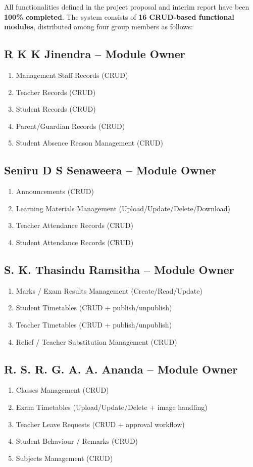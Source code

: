 \documentclass[12pt, a4paper]{report}
\begin{document}
All functionalities defined in the project proposal and interim report have been \textbf{100\% completed}. The system consists of \textbf{16 CRUD-based functional modules}, distributed among four group members as follows:

\subsection{R K K Jinendra -- Module Owner}
\begin{enumerate}
    \item Management Staff Records (CRUD)
    \item Teacher Records (CRUD)
    \item Student Records (CRUD)
    \item Parent/Guardian Records (CRUD)
    \item Student Absence Reason Management (CRUD)
\end{enumerate}

\subsection{Seniru D S Senaweera -- Module Owner}
\begin{enumerate}
    \item Announcements (CRUD)
    \item Learning Materials Management (Upload/Update/Delete/Download)
    \item Teacher Attendance Records (CRUD)
    \item Student Attendance Records (CRUD)
\end{enumerate}

\subsection{S. K. Thasindu Ramsitha -- Module Owner}
\begin{enumerate}
    \item Marks / Exam Results Management (Create/Read/Update)
    \item Student Timetables (CRUD + publish/unpublish)
    \item Teacher Timetables (CRUD + publish/unpublish)
    \item Relief / Teacher Substitution Management (CRUD)
\end{enumerate}

\subsection{R. S. R. G. A. A. Ananda -- Module Owner}
\begin{enumerate}
    \item Classes Management (CRUD)
    \item Exam Timetables (Upload/Update/Delete + image handling)
    \item Teacher Leave Requests (CRUD + approval workflow)
    \item Student Behaviour / Remarks (CRUD)
    \item Subjects Management (CRUD)
\end{enumerate}
\end{document}

